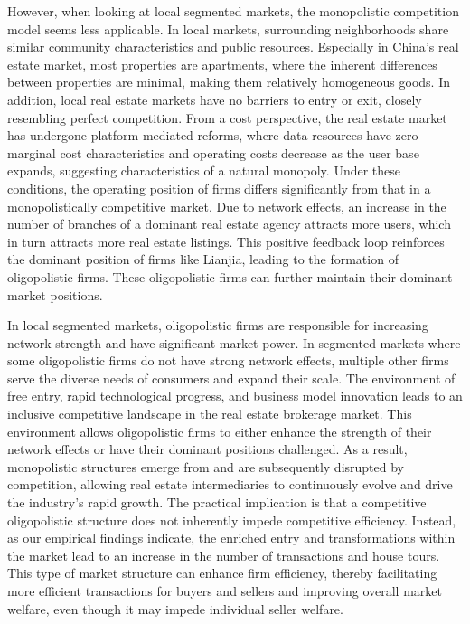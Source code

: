 \documentclass[11pt]{article}
\begin{document}
However, when looking at local segmented markets, the monopolistic competition model seems less applicable. In local markets, surrounding neighborhoods share similar community characteristics and public resources. Especially in China's real estate market, most properties are apartments, where the inherent differences between properties are minimal, making them relatively homogeneous goods. In addition, local real estate markets have no barriers to entry or exit, closely resembling perfect competition. From a cost perspective, the real estate market has undergone platform mediated reforms, where data resources have zero marginal cost characteristics and operating costs decrease as the user base expands, suggesting characteristics of a natural monopoly. Under these conditions, the operating position of firms differs significantly from that in a monopolistically competitive market. Due to network effects, an increase in the number of branches of a dominant real estate agency attracts more users, which in turn attracts more real estate listings. This positive feedback loop reinforces the dominant position of firms like Lianjia, leading to the formation of oligopolistic firms. These oligopolistic firms can further maintain their dominant market positions.

In local segmented markets, oligopolistic firms are responsible for increasing network strength and have significant market power. In segmented markets where some oligopolistic firms do not have strong network effects, multiple other firms serve the diverse needs of consumers and expand their scale. The environment of free entry, rapid technological progress, and business model innovation leads to an inclusive competitive landscape in the real estate brokerage market. This environment allows oligopolistic firms to either enhance the strength of their network effects or have their dominant positions challenged. As a result, monopolistic structures emerge from and are subsequently disrupted by competition, allowing real estate intermediaries to continuously evolve and drive the industry's rapid growth. The practical implication is that a competitive oligopolistic structure does not inherently impede competitive efficiency. Instead, as our empirical findings indicate, the enriched entry and transformations within the market lead to an increase in the number of transactions and house tours. This type of market structure can enhance firm efficiency, thereby facilitating more efficient transactions for buyers and sellers and improving overall market welfare, even though it may impede individual seller welfare.
\end{document}
